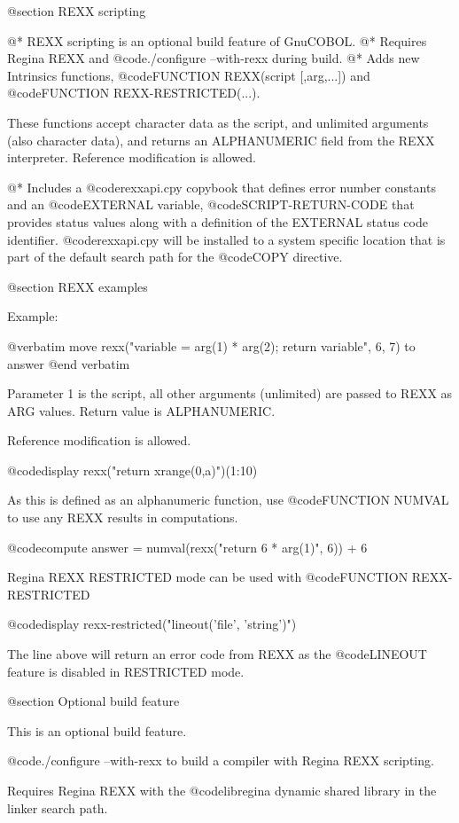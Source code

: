 @section REXX scripting

@*
REXX scripting is an optional build feature of GnuCOBOL.
@*
Requires Regina REXX and @code{./configure --with-rexx} during build.
@*
Adds new Intrinsics functions, @code{FUNCTION REXX(script [,arg,...])} and
@code{FUNCTION REXX-RESTRICTED(...)}.

These functions accept character data as the script, and unlimited arguments
(also character data), and returns an ALPHANUMERIC field from the REXX
interpreter.  Reference modification is allowed.

@* 
Includes a @code{rexxapi.cpy} copybook that defines error number constants and
an @code{EXTERNAL} variable, @code{SCRIPT-RETURN-CODE} that provides status
values along with a definition of the EXTERNAL status code identifier.
@code{rexxapi.cpy} will be installed to a system specific location that is part
of the default search path for the @code{COPY} directive.

@section REXX examples

Example:

@verbatim
    move rexx("variable = arg(1) * arg(2); return variable", 6, 7)
      to answer
@end verbatim

Parameter 1 is the script, all other arguments (unlimited) are passed to REXX
as ARG values. Return value is ALPHANUMERIC.

Reference modification is allowed.

    @code{display rexx("return xrange(0,a)")(1:10)}

As this is defined as an alphanumeric function, use @code{FUNCTION NUMVAL} to
use any REXX results in computations.

    @code{compute answer = numval(rexx("return 6 * arg(1)", 6)) + 6}

Regina REXX RESTRICTED mode can be used with @code{FUNCTION REXX-RESTRICTED}

    @code{display rexx-restricted("lineout('file', 'string')")}

The line above will return an error code from REXX as the @code{LINEOUT}
feature is disabled in RESTRICTED mode. 

@section Optional build feature

This is an optional build feature.

@code{./configure --with-rexx} to build a compiler with Regina REXX
scripting.

Requires Regina REXX with the @code{libregina} dynamic shared library in the
linker search path.
